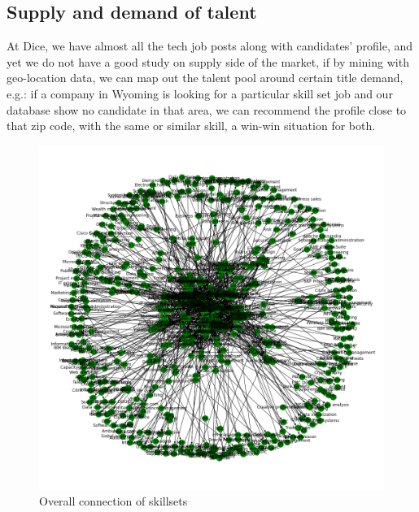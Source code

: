 \subsection{Supply and demand of talent}
At Dice, we have almost all the tech job posts along with candidates' profile, and yet we do not have a good study on supply side of the market, if by mining with geo-location data, we can map out the talent pool around certain title demand, e.g.: if a company in Wyoming is looking for a particular skill set job and our database show no candidate in that area, we can recommend the profile close to that zip code, with the same or similar skill, a win-win situation for both.
\begin{figure}[h]
	\begin{center}
		\includegraphics[width=\linewidth]{./photos/knowlegegraphsmall.png}
	\end{center}
	\caption{Overall connection of skillsets}
	\label{connect}
\end{figure}
